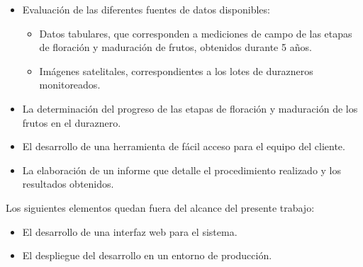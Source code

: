 \begin{itemize}
  \item Evaluación de las diferentes fuentes de datos disponibles:
  \begin{itemize}
    \item Datos tabulares, que corresponden a mediciones de campo
    de las etapas de floración y maduración de frutos, obtenidos durante 5
    años.
    \item Imágenes satelitales, correspondientes a los lotes de durazneros monitoreados.
    \end{itemize}
  \item La determinación del progreso de las etapas de floración y maduración de
  los frutos en el duraznero.
  \item El desarrollo de una herramienta de fácil acceso para el equipo del cliente.
  \item La elaboración de un informe que detalle el procedimiento realizado y los resultados obtenidos.  
  \end{itemize}

  Los siguientes elementos quedan fuera del alcance del presente trabajo:
  \begin{itemize}
    \item El desarrollo de una interfaz web para el sistema.
    \item El despliegue del desarrollo en un entorno de producción.
    \end{itemize}

